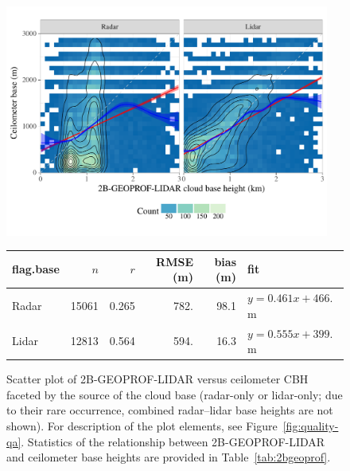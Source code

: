 \documentclass[essd,manuscript]{copernicus}\usepackage[]{graphicx}\usepackage[]{color}
\newenvironment{knitrout}{}{} %
\begin{document}
\begin{figure}
  \centering

\begin{knitrout}
\color{fgcolor}

{\centering \includegraphics[width=0.95\textwidth]{figure/method-eval-2bgeoprof-1} 

}



\end{knitrout}
\begin{tabular}{lrrrrl}
  \hline
\hline
flag.base & $n$ & $r$ & RMSE (m) & bias (m) & fit \\ 
  \hline
Radar & 15061 & 0.265 & 782. & 98.1 & $y = 0.461 x + 466.$ m \\ 
  Lidar & 12813 & 0.564 & 594. & 16.3 & $y = 0.555 x + 399.$ m \\ 
   \hline
\hline
\end{tabular}

  \caption{Scatter plot of 2B-GEOPROF-LIDAR versus ceilometer CBH
    faceted by the source of the cloud base (radar-only or lidar-only; due to
    their rare occurrence, combined radar--lidar base heights are not shown).
    For description of the plot elements, see Figure~\ref{fig:quality-qa}.  Statistics of the
    relationship between 2B-GEOPROF-LIDAR and ceilometer base heights are provided in
    Table~\ref{tab:2bgeoprof}.}
  \label{fig:eval-2b}
\end{figure}
\end{document}
